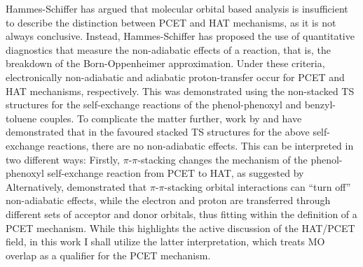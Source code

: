 \begin{doublespace}
Hammes-Schiffer has argued that molecular orbital based analysis is insufficient
to describe the distinction between PCET and HAT mechanisms, as it is not always
conclusive.\cite{Skone2006, HammesSchiffer2015} Instead, Hammes-Schiffer has
proposed the use of quantitative diagnostics that measure the non-adiabatic
effects of a reaction, that is, the breakdown of the Born-Oppenheimer
approximation.\cite{Sirjoosingh2011, HammesSchiffer2015} Under these criteria,
electronically non-adiabatic and adiabatic proton-transfer occur for PCET and
HAT mechanisms, respectively. This was demonstrated using the non-stacked TS
structures for the self-exchange reactions of the phenol-phenoxyl and
benzyl-toluene couples. To complicate the matter further, work by
\citet{Inagaki2011} and \citet{MunozRugeles2017} have demonstrated that in the
favoured stacked TS structures for the above self-exchange reactions, there are
no non-adiabatic effects. This can be interpreted in two different ways:
Firstly, $\pi$-$\pi$-stacking changes the mechanism of the phenol-phenoxyl
self-exchange reaction from PCET to HAT, as suggested by \citet{Inagaki2011}
Alternatively, \citet{MunozRugeles2017} demonstrated that $\pi$-$\pi$-stacking
orbital interactions can ``turn off'' non-adiabatic effects, while the electron
and proton are transferred through different sets of acceptor and donor
orbitals, thus fitting within the definition of a PCET mechanism. While this
highlights the active discussion of the HAT/PCET field, in this work I shall
utilize the latter interpretation, which treats MO overlap as a qualifier for
the PCET mechanism.


\end{doublespace}
